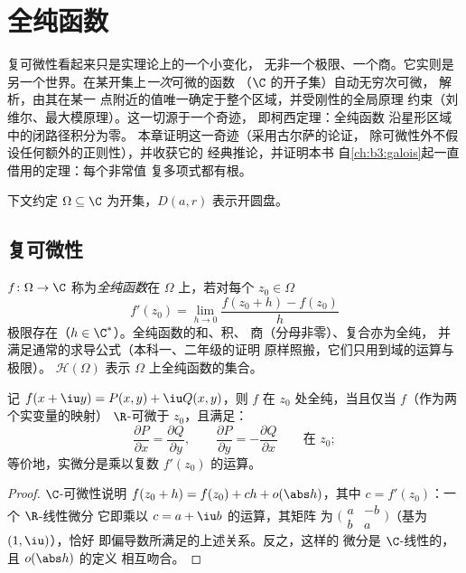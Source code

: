 \chapter{全纯函数}\label{ch:b3:holomorphic}

复可微性看起来只是实理论上的一个小变化，
无非一个极限、一个商。它实则是
另一个世界。在某开集上\emph{一次}可微的函数
（$\C$ 的开子集）自动无穷次可微，
解析，由其在某一
点附近的值唯一确定于整个区域，并受刚性的全局原理
约束（刘维尔、最大模原理）。这一切源于一个奇迹，
即柯西定理：全纯函数
沿星形区域中的闭路径积分为零。
本章证明这一奇迹（采用古尔萨的论证，
除可微性外不假设任何额外的正则性），并收获它的
经典推论，并证明本书
自\cref{ch:b3:galois}起一直借用的定理：每个非常值
复多项式都有根。

下文约定 $\Omega \subseteq \C$ 为开集，$D(a, r)$
表示开圆盘。

\section{复可微性}

\begin{definition}\label{def:b3:holomorphic:holo}
$f \colon \Omega \to \C$ 称为\emph{全纯函数}在 $\Omega$ 上，若对每个 $z_0 \in \Omega$
\[
f'(z_0) = \lim_{h\to0}\frac{f(z_0 + h) - f(z_0)}{h}
\]
极限存在（$h \in \C^*$）。全纯函数的和、积、
商（分母非零）、复合亦为全纯，
并满足通常的求导公式（本科一、二年级的证明
原样照搬，它们只用到域的运算与极限）。
$\mathcal H(\Omega)$ 表示
$\Omega$ 上全纯函数的集合。
\end{definition}

\begin{proposition}[柯西–黎曼]
\label{prop:b3:holomorphic:cauchyriemann}
记 $f(x + \iu y) = P(x,y) + \iu Q(x,y)$，则 $f$
在 $z_0$ 处全纯，当且仅当 $f$（作为两个实变量的映射）
$\R$-可微于 $z_0$，且满足：
\[
\frac{\partial P}{\partial x} = \frac{\partial Q}{\partial y},
\qquad
\frac{\partial P}{\partial y} = -\frac{\partial Q}{\partial x}
\qquad \text{在 } z_0 ;
\]
等价地，实微分是乘以复数
$f'(z_0)$ 的运算。
\end{proposition}

\begin{proof}
$\C$-可微性说明 $f(z_0 + h) = f(z_0) + ch +
o(\abs h)$，其中 $c = f'(z_0)$：一个 $\R$-线性微分
它即乘以 $c = a + \iu b$ 的运算，其矩阵
为 $\bigl(\begin{smallmatrix} a & -b\\ b & a
\end{smallmatrix}\bigr)$（基为 $(1, \iu)$），恰好
即偏导数所满足的上述关系。反之，这样的
微分是 $\C$-线性的，且 $o(\abs h)$ 的定义
相互吻合。
\end{proof}

